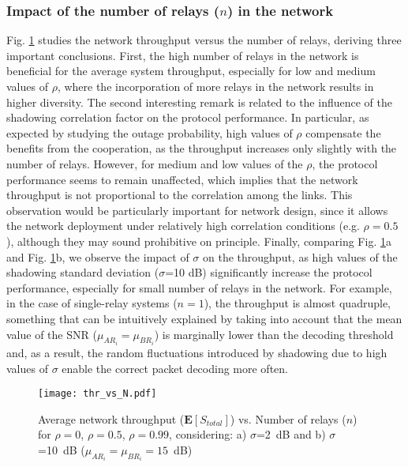 \documentclass[12pt,draftcls, onecolumn]{IEEEtran}
\begin{document}
\subsubsection{Impact of the number of relays ($n$) in the network}

Fig. \ref{th1} studies the network throughput versus the number of relays, deriving three important conclusions. First, the high number of relays in the network is beneficial for the average system throughput, especially for low and medium values of $\rho$, where the incorporation of more relays in the network results in higher diversity. The second interesting remark is related to the influence of the shadowing correlation factor on the protocol performance. In particular, as expected by studying the outage probability, high values of $\rho$ compensate the benefits from the cooperation, as the throughput increases only slightly with the number of relays. However, for medium and low values of the $\rho$, the protocol performance seems to remain unaffected, which implies that the network throughput is not proportional to the correlation among the links. This observation would be particularly important for network design, since it allows the network deployment under relatively high correlation conditions (e.g. $\rho=0.5$), although they may sound prohibitive on principle. Finally, comparing Fig. \ref{th1}a and Fig. \ref{th1}b, we observe the impact of $\sigma$ on the throughput, as high values of the shadowing standard deviation ($\sigma$=10 dB) significantly increase the protocol performance, especially for small number of relays in the network. For example, in the case of single-relay systems ($n=1$), the throughput is almost quadruple, something that can be intuitively explained by taking into account that the mean value of the SNR ($\mu_{AR_i}=\mu_{BR_i}$) is marginally lower than the decoding threshold and, as a result, the random fluctuations introduced by shadowing due to high values of $\sigma$ enable the correct packet decoding more often.

\begin{figure}[htb]
\centering
\texttt{[image: thr\_vs\_N.pdf]}
\caption{Average network throughput ($\mathbf{E}[S_{total}]$) vs. Number of relays ($n$) for $\rho=0$, $\rho=0.5$, $\rho=0.99$, considering: a) $\sigma$=2~dB and b) $\sigma$=10~dB ($\mu_{AR_i}=\mu_{BR_i}=15$~dB)} \label{th1}
\end{figure}
\end{document}
